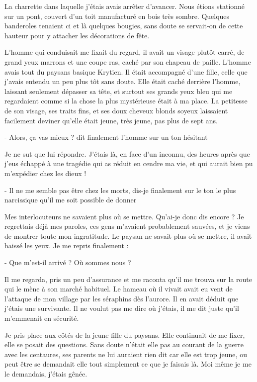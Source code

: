 \documentclass{book}
\begin{document}
La charrette dans laquelle j'étais avais arrêter d'avancer. Nous étions stationné sur un pont, couvert d'un toit manufacturé en bois très sombre. Quelques banderoles tenaient ci et là quelques bougies, sans doute se servait-on de cette hauteur pour y attacher les décorations de fête.\newline

L'homme qui conduisait me fixait du regard, il avait un visage plutôt carré, de grand yeux marrons et une coupe ras, caché par son chapeau de paille. L'homme avais tout du paysans basique Krytien. Il était accompagné d'une fille, celle que j'avais entendu un peu plus tôt sans doute. Elle était caché derrière l'homme, laissant seulement dépasser sa tête, et surtout ses grands yeux bleu qui me regardaient comme si la chose la plus mystérieuse était à ma place. La petitesse de son visage, ses traits fins, et ses doux cheveux blonds soyeux laissaient facilement deviner qu'elle était jeune, très jeune, pas plus de sept ans.\newline

- Alors, ça vas mieux ? dit finalement l'homme sur un ton hésitant

Je ne sut que lui répondre. J'étais là, en face d'un inconnu, des heures après que j'eus échappé à une tragédie qui as réduit en cendre ma vie, et qui aurait bien pu m'expédier chez les dieux !

- Il ne me semble pas être chez les morts, dis-je finalement sur le ton le plus narcissique qu'il me soit possible de donner

Mes interlocuteurs ne savaient plus où se mettre. Qu'ai-je donc dis encore ? Je regrettais déjà mes paroles, ces gens m'avaient probablement sauvées, et je viens de montrer toute mon ingratitude. Le paysan ne savait plus où se mettre, il avait baissé les yeux. Je me repris finalement :

- Que m'est-il arrivé ? Où sommes nous ?\newline

Il me regarda, pris un peu d'assurance et me raconta qu'il me trouva sur la route qui le mène à son marché habituel. Le hameau où il vivait avait eu vent de l'attaque de mon village par les séraphins dès l'aurore. Il en avait déduit que j'étais une survivante. Il ne voulut pas me dire où j'étais, il me dit juste qu'il m'emmenait en sécurité.\newline

Je pris place aux côtés de la jeune fille du paysans. Elle continuait de me fixer, elle se posait des questions. Sans doute n'était elle pas au courant de la guerre avec les centaures, ses parents ne lui auraient rien dit car elle est trop jeune, ou peut être se demandait elle tout simplement ce que je faisais là. Moi même je me le demandais, j'étais gênée.\newline
\end{document}
